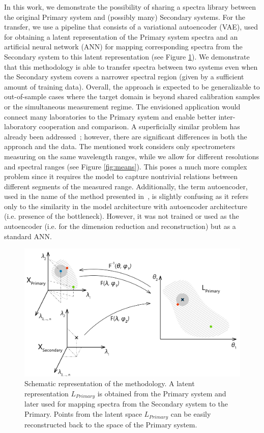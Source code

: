 \documentclass[preprint,11pt]{elsarticle}
\begin{document}
In this work, we demonstrate the possibility of sharing a spectra library between the original Primary system and (possibly many) Secondary systems. For the transfer, we use a pipeline that consists of a variational autoencoder (VAE), used for obtaining a latent representation of the Primary system spectra and an artificial neural network (ANN) for mapping corresponding spectra from the Secondary system to this latent representation (see Figure \ref{fig:schema}). We demonstrate that this methodology is able to transfer spectra between two systems even when the Secondary system covers a narrower spectral region (given by a sufficient amount of training data). Overall, the approach is expected to be generalizable to out-of-sample cases where the target domain is beyond shared calibration samples or the simultaneous measurement regime. The envisioned application would connect many laboratories to the Primary system and enable better inter-laboratory cooperation and comparison.
A superficially similar problem has already been addressed~\cite{chen2016calibration}; however, there are significant differences in both the approach and the data. The mentioned work considers only spectrometers measuring on the same wavelength ranges, while we allow for different resolutions and spectral ranges (see Figure \ref{fig:means}). This poses a much more complex problem since it requires the model to capture nontrivial relations between different segments of the measured range. Additionally, the term autoencoder, used in the name of the method presented in~\cite{chen2016calibration}, is slightly confusing as it refers only to the similarity in the model architecture with autoencoder architecture (i.e. presence of the bottleneck). However, it was not trained or used as the autoencoder (i.e. for the dimension reduction and reconstruction) but as a standard ANN.

\begin{figure}[!htb]
    \centering
    \includegraphics[width=\textwidth]{schema.png}
    \caption{Schematic representation of the methodology. A latent representation $L_{Primary}$ is obtained from the Primary system and later used for mapping spectra from the Secondary system to the Primary. Points from the latent space $L_{Primary}$ can be easily reconstructed back to the space of the Primary system.}
    \label{fig:schema}
\end{figure}
\end{document}
